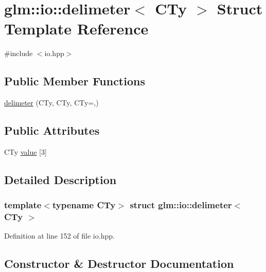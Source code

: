 \hypertarget{structglm_1_1io_1_1delimeter}{}\section{glm\+:\+:io\+:\+:delimeter$<$ C\+Ty $>$ Struct Template Reference}
\label{structglm_1_1io_1_1delimeter}


{\ttfamily \#include $<$io.\+hpp$>$}

\subsection*{Public Member Functions}
\begin{DoxyCompactItemize}
\item 
\hyperlink{structglm_1_1io_1_1delimeter_a5c1db62fae08a4c96eaf336781a4b53d}{delimeter} (C\+Ty, C\+Ty, C\+Ty=\textquotesingle{},\textquotesingle{})
\end{DoxyCompactItemize}
\subsection*{Public Attributes}
\begin{DoxyCompactItemize}
\item 
C\+Ty \hyperlink{structglm_1_1io_1_1delimeter_a9ade129dae50c4f716f724e7425f9c68}{value} \mbox{[}3\mbox{]}
\end{DoxyCompactItemize}


\subsection{Detailed Description}
\subsubsection*{template$<$typename C\+Ty$>$\newline
struct glm\+::io\+::delimeter$<$ C\+Ty $>$}



Definition at line 152 of file io.\+hpp.



\subsection{Constructor \& Destructor Documentation}
\mbox{\label{structglm_1_1io_1_1delimeter_a5c1db62fae08a4c96eaf336781a4b53d}} 
